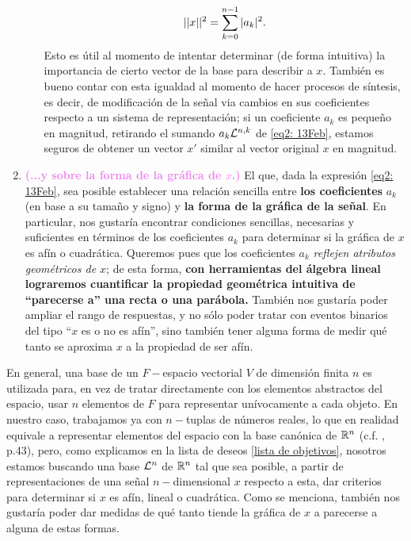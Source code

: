 \begin{listaObj}
\begin{enumerate}
\begin{itemize}
\[
||x||^{2}= \sum\limits_{k=0}^{n-1}|a_{k}|^{2}.
\]
Esto es útil al momento
de intentar determinar
(de forma intuitiva) 
la importancia 
de cierto vector de la base para describir a $x$.
También es bueno contar con esta igualdad
al momento de hacer procesos de síntesis,
es decir, de modificación de la señal
via cambios en sus coeficientes respecto
a un sistema de representación; si un coeficiente
$a_{k}$ es pequeño en magnitud, retirando el sumando
$a_{k} \mathcal{L}^{n,k}$ de \eqref{eq2: 13Feb}, 
estamos seguros de obtener
un vector $x'$ similar al vector original $x$
en magnitud.
\end{itemize}
\item \textbf{
\textcolor{violet}{(...y sobre la forma de la
gráfica de $x$.)}} El que,
dada la expresión \eqref{eq2: 13Feb},
sea posible establecer
una relación sencilla entre \textbf{los coeficientes }
$a_{k}$
(en base a su tamaño y signo) y
\textbf{la forma de la gráfica de la señal}.
En particular, nos gustaría encontrar condiciones
sencillas,
necesarias y suficientes 
en términos de los coeficientes $a_{k}$ para determinar
si la gráfica de $x$ es afín o cuadrática.
Queremos pues que los coeficientes $a_{k}$
\textit{reflejen atributos geométricos de $x$};
de esta forma, 
\textbf{con herramientas del álgebra lineal lograremos cuantificar
la propiedad geométrica intuitiva de ``parecerse a''
una recta o una parábola.} También nos gustaría poder ampliar
el rango de respuestas, y no sólo poder tratar con eventos
binarios del tipo ``$x$ es o no es afín'', sino
también tener alguna forma de medir qué tanto se aproxima
$x$ a la propiedad de ser afín.
\end{enumerate} 

\end{listaObj}


En general, una base de un 
$F-$espacio vectorial $V$ de dimensión finita $n$
es utilizada para, en vez de tratar 
directamente con los elementos abstractos
del espacio, usar $n$ elementos de $F$
para representar unívocamente a cada objeto. En nuestro caso,
trabajamos ya con $n-$tuplas de números reales,
lo que en realidad equivale a representar elementos
del espacio con la base canónica de $\mathbb{R}^{n}$
(c.f. \cite{friedberg}, p.43), pero,
como explicamos en la lista de deseos
\ref{lista de objetivos},
nosotros estamos buscando una base $\mathcal{L}^{n}$ 
de $\mathbb{R}^{n}$ tal que
sea posible, a partir de representaciones
de una señal $n-$dimensional $x$
respecto a esta, dar
criterios para determinar si $x$ es afín, lineal o cuadrática.
Como se menciona, también nos gustaría poder dar medidas
de qué tanto tiende 
la gráfica de
$x$ a parecerse a alguna de estas formas.



